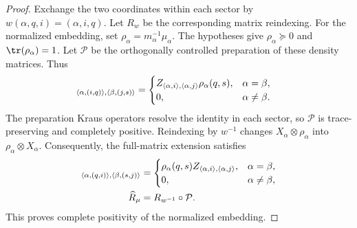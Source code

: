 \begin{proof}\leanok

    Exchange the two coordinates within each sector by
    $w(\alpha,q,i)=(\alpha,i,q)$. Let $R_w$ be the corresponding matrix
    reindexing. For the normalized embedding, set
    $\rho_\alpha=m_\alpha^{-1}\mu_\alpha$.
    The hypotheses give $\rho_\alpha\succeq0$ and
    $\tr(\rho_\alpha)=1$. Let $\mathcal P$ be the
    orthogonally controlled preparation of these density matrices. Thus
    \begin{align}
        [\mathcal P(Z)]_{\langle\alpha,(i,q)\rangle,
                \langle\beta,(j,s)\rangle}
         & =
        \begin{cases}
            Z_{\langle\alpha,i\rangle,\langle\alpha,j\rangle}
            \rho_\alpha(q,s), & \alpha=\beta,   \\
            0,                & \alpha\ne\beta.
        \end{cases}
        \notag
    \end{align}
    The preparation Kraus operators resolve the identity in each sector, so
    $\mathcal P$ is trace-preserving and completely positive. Reindexing by
    $w^{-1}$ changes $X_\alpha\otimes\rho_\alpha$ into
    $\rho_\alpha\otimes X_\alpha$. Consequently, the full-matrix extension
    satisfies
    \begin{align}
        [\widehat R_\mu(Z)]_{\langle\alpha,(q,i)\rangle,
                \langle\beta,(s,j)\rangle}
         & =
        \begin{cases}
            \rho_\alpha(q,s)
            Z_{\langle\alpha,i\rangle,\langle\alpha,j\rangle},
               & \alpha=\beta,   \\
            0, & \alpha\ne\beta,
        \end{cases}
        \notag                         \\
        \widehat R_\mu
         & =R_{w^{-1}}\circ\mathcal P.
        \notag
    \end{align}
    This proves complete positivity of the normalized embedding.


\end{proof}
